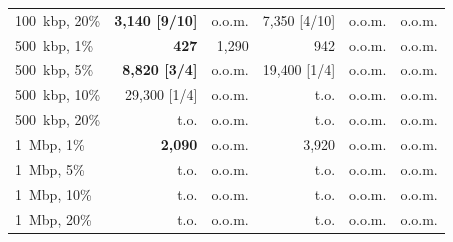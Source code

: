 \documentclass[10pt]{article}
\begin{document}
\begin{table}[t]
{\begin{tabular}{@{}lrrrrr@{}}
100~kbp, 20\% & \textbf{3{,}140 [9/10]} & o.o.m. & 7{,}350 [4/10] & o.o.m. & o.o.m. \\
500~kbp, 1\% & \textbf{427} & 1{,}290 & 942 & o.o.m. & o.o.m. \\
500~kbp, 5\% & \textbf{8{,}820 [3/4]} & o.o.m. & 19{,}400 [1/4] & o.o.m. & o.o.m. \\
500~kbp, 10\% & 29{,}300 [1/4] & o.o.m. & t.o. & o.o.m. & o.o.m. \\
500~kbp, 20\% & t.o. & o.o.m. & t.o. & o.o.m. & o.o.m. \\
1~Mbp, 1\% & \textbf{2{,}090} & o.o.m. & 3{,}920 & o.o.m. & o.o.m. \\
1~Mbp, 5\% & t.o. & o.o.m. & t.o. & o.o.m. & o.o.m. \\
1~Mbp, 10\% & t.o. & o.o.m. & t.o. & o.o.m. & o.o.m. \\
1~Mbp, 20\% & t.o. & o.o.m. & t.o. & o.o.m. & o.o.m. \\
\bottomrule
\end{tabular}}
\end{table}
\end{document}
